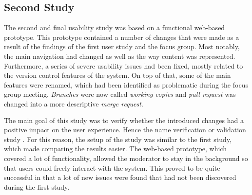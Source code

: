 
\subsection{Second Study}
The second and final usability study was based on a functional web-based prototype. This prototype contained a number of changes that were made as a result of the findings of the first user study and the focus group. Most notably, the main navigation had changed as well as the way content was represented. Furthermore, a series of severe usability issues had been fixed, mostly related to the version control features of the system. On top of that, some of the main features were renamed, which had been identified as problematic during the focus group meeting. \textit{Branches} were now called \textit{working copies} and \textit{pull request} was changed into a more descriptive \textit{merge request}.

The main goal of this study was to verify whether the introduced changes had a positive impact on the user experience. Hence the name verification or validation study \cite{goodman_observing_2012,rubin_handbook_2008}.
For this reason, the setup of the study was similar to the first study, which made comparing the results easier. The web-based prototype, which covered a lot of functionality, allowed the moderator to stay in the background so that users could freely interact with the system. This proved to be quite successful in that a lot of new issues were found that had not been discovered during the first study.

